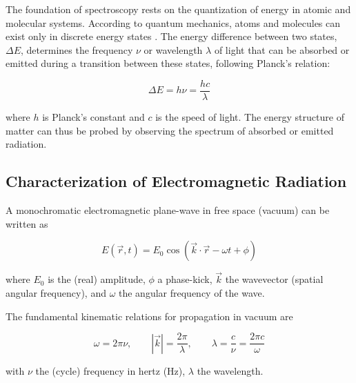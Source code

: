 \noindent The foundation of spectroscopy rests on the quantization of energy in atomic and molecular systems. According to quantum mechanics, atoms and molecules can exist only in discrete energy states \cite{albashetal2012quantumadiabaticmarkovian}. The energy difference between two states, $\Delta E$, determines the frequency $\nu$ or wavelength $\lambda$ of light that can be absorbed or emitted during a transition between these states, following Planck's relation:

\begin{equation}
	\Delta E = h\nu = \frac{hc}{\lambda}
	\label{eq:planck_relation}
\end{equation}

\noindent 
where $h$ is Planck's constant and $c$ is the speed of light. The energy structure of matter can thus be probed by observing the spectrum of absorbed or emitted radiation.


\subsection{Characterization of Electromagnetic Radiation}
\label{subsec:em_radiation_characterization}

\noindent 
A monochromatic electromagnetic plane-wave in free space (vacuum) can be written as

\begin{equation}
	E(\vec{r},t) = E_0 \cos(\vec{k} \cdot \vec{r} - \omega t + \phi)
	\label{eq:plane_wave}
\end{equation}

\noindent 
where $E_0$ is the (real) amplitude, $\phi$ a phase-kick, $\vec{k}$ the wavevector (spatial angular frequency), and $\omega$ the angular frequency of the wave.

\noindent 
The fundamental kinematic relations for propagation in vacuum are

\begin{equation}
	\omega = 2\pi\nu, \qquad |\vec{k}| = \frac{2\pi}{\lambda}, \qquad \lambda = \frac{c}{\nu} = \frac{2\pi c}{\omega}
	\label{eq:wavelength_frequency_relation}
\end{equation}

\noindent 
with $\nu$ the (cycle) frequency in hertz (Hz), $\lambda$ the wavelength. 

